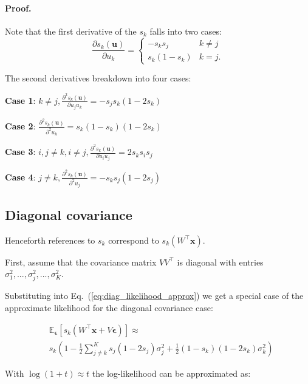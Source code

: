 \documentclass[final]{cvpr}
\newcommand{\brac}[1]{\left[#1\right]}
\begin{document}
\paragraph{Proof.}
Note that the first derivative of the $s_k$ falls into two cases:
\begin{equation}
\frac{\partial s_k(\mathbf{u})}{\partial u_k} = \begin{cases}
- s_k s_j & k \neq j\\
 s_k (1 - s_k)  &  k = j.
\end{cases}
\end{equation}

\noindent
The second derivatives breakdown into four cases:

\textbf{Case 1}: $k \neq j, \frac{\partial^2 s_k(\mathbf{u})}{\partial u_j u_k} = - s_j s_k (1 - 2 s_k)$

\textbf{Case 2}: $\frac{\partial^2 s_k(\mathbf{u})}{\partial^2 u_k} = s_k (1 - s_k) (1 - 2 s_k)$

\textbf{Case 3}: $i, j \neq k, i \neq j, \frac{\partial^2 s_k(\mathbf{u})}{\partial u_i u_j} = 2 s_k s_i s_j$

\textbf{Case 4}: $j \neq k, \frac{\partial^2 s_k(\mathbf{u})}{\partial^2 u_j} = - s_k s_j (1 - 2 s_j)$

\subsection{Diagonal covariance}

Henceforth references to $s_k$ correspond to $s_k(W^\intercal \mathbf{x})$.

First, assume that the covariance matrix $V V^\intercal$ is diagonal with entries $\sigma_1^2, ..., \sigma_j^2, ..., \sigma_K^2$.

Substituting into Eq.~(\ref{eq:diag_likelihood_approx}) we get a special case of the approximate likelihood for the diagonal covariance case:

\begin{equation}
\begin{split}
    &\mathbb{E}_{\boldsymbol{\epsilon}} \brac{s_k(W^\intercal \mathbf{x} + V \boldsymbol{\epsilon})} \approx \\ &s_k(1 - \frac{1}{2} \sum_{j \neq k}^K s_j (1 - 2 s_j) \sigma_j^2 + \frac{1}{2} (1 - s_k) (1 - 2 s_k) \sigma_k^2)
\end{split}
\label{eq:diag_likelihood_approx}    
\end{equation}

With $\log(1 + t) \approx t$ the log-likelihood can be approximated as:
\end{document}
